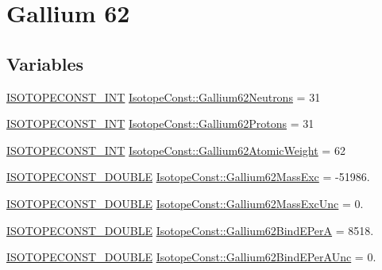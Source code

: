 \hypertarget{group___isotope_const-_gallium-_ga62}{}\section{Gallium 62}
\label{group___isotope_const-_gallium-_ga62}
\subsection*{Variables}
\begin{DoxyCompactItemize}
\item 
\mbox{\hyperlink{group___isotope_const-_macros_ga5f18360b3e99483a35c32d789e62621c}{I\+S\+O\+T\+O\+P\+E\+C\+O\+N\+S\+T\+\_\+\+I\+NT}} \mbox{\hyperlink{group___isotope_const-_gallium-_ga62_ga58346aec06ac7cff903dd25b90220040}{Isotope\+Const\+::\+Gallium62\+Neutrons}} = 31
\item 
\mbox{\hyperlink{group___isotope_const-_macros_ga5f18360b3e99483a35c32d789e62621c}{I\+S\+O\+T\+O\+P\+E\+C\+O\+N\+S\+T\+\_\+\+I\+NT}} \mbox{\hyperlink{group___isotope_const-_gallium-_ga62_ga1b96d7b558cf6669689c09244ef8cb12}{Isotope\+Const\+::\+Gallium62\+Protons}} = 31
\item 
\mbox{\hyperlink{group___isotope_const-_macros_ga5f18360b3e99483a35c32d789e62621c}{I\+S\+O\+T\+O\+P\+E\+C\+O\+N\+S\+T\+\_\+\+I\+NT}} \mbox{\hyperlink{group___isotope_const-_gallium-_ga62_ga0c9b208f0d1a336c0085e8176678790e}{Isotope\+Const\+::\+Gallium62\+Atomic\+Weight}} = 62
\item 
\mbox{\hyperlink{group___isotope_const-_macros_ga8f45a7272ce02c0b4c65c44636ed719a}{I\+S\+O\+T\+O\+P\+E\+C\+O\+N\+S\+T\+\_\+\+D\+O\+U\+B\+LE}} \mbox{\hyperlink{group___isotope_const-_gallium-_ga62_gabcceeec50738dbe66323430c89215d55}{Isotope\+Const\+::\+Gallium62\+Mass\+Exc}} = -\/51986.
\item 
\mbox{\hyperlink{group___isotope_const-_macros_ga8f45a7272ce02c0b4c65c44636ed719a}{I\+S\+O\+T\+O\+P\+E\+C\+O\+N\+S\+T\+\_\+\+D\+O\+U\+B\+LE}} \mbox{\hyperlink{group___isotope_const-_gallium-_ga62_gabb9bf9b8f28e79fe67304498fea591c5}{Isotope\+Const\+::\+Gallium62\+Mass\+Exc\+Unc}} = 0.
\item 
\mbox{\hyperlink{group___isotope_const-_macros_ga8f45a7272ce02c0b4c65c44636ed719a}{I\+S\+O\+T\+O\+P\+E\+C\+O\+N\+S\+T\+\_\+\+D\+O\+U\+B\+LE}} \mbox{\hyperlink{group___isotope_const-_gallium-_ga62_gab0f1dfff67818a94e441cd0c7dc80a5a}{Isotope\+Const\+::\+Gallium62\+Bind\+E\+PerA}} = 8518.
\item 
\mbox{\hyperlink{group___isotope_const-_macros_ga8f45a7272ce02c0b4c65c44636ed719a}{I\+S\+O\+T\+O\+P\+E\+C\+O\+N\+S\+T\+\_\+\+D\+O\+U\+B\+LE}} \mbox{\hyperlink{group___isotope_const-_gallium-_ga62_ga9a742893a63a605bd81169be6c1a2e44}{Isotope\+Const\+::\+Gallium62\+Bind\+E\+Per\+A\+Unc}} = 0.

\end{DoxyCompactItemize}
